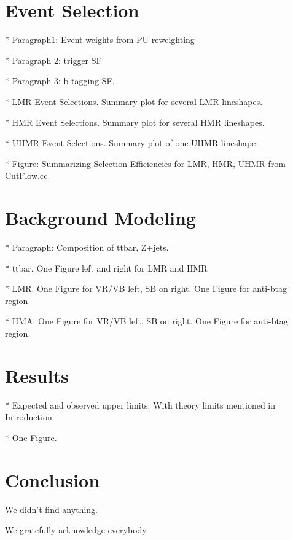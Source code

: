\documentclass[aps,prd,reprint,superscriptaddress,nofootinbib,showpacs,floatfix]{revtex4-1}
\begin{document}
\section{Event Selection}

* Paragraph1: Event weights from PU-reweighting

* Paragraph 2: trigger SF

* Paragraph 3: b-tagging SF.

* LMR Event Selections. Summary plot for several LMR lineshapes.

* HMR Event Selections. Summary plot for several HMR lineshapes.

* UHMR Event Selections. Summary plot of one UHMR lineshape.

* Figure: Summarizing Selection Efficiencies for LMR, HMR, UHMR from CutFlow.cc.

\section{Background Modeling}

* Paragraph: Composition of ttbar, Z+jets.

* ttbar. One Figure left and right for LMR and HMR

* LMR. One Figure for VR/VB left, SB on right. One Figure for anti-btag region.

* HMA. One Figure for VR/VB left, SB on right. One Figure for anti-btag region.

\section{Results}

* Expected and observed upper limits. With theory limits mentioned in Introduction.

* One Figure.

\section{Conclusion}

We didn't find anything.


\begin{acknowledgments}
We gratefully acknowledge everybody.
\end{acknowledgments}


\end{document}
